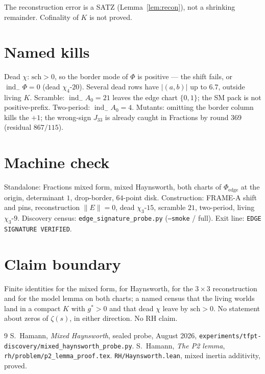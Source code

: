 \documentclass[11pt]{article}
\theoremstyle{remark}
\newcommand{\indm}{\operatorname{ind}_{-}}
\begin{document}
The reconstruction error is a SATZ (Lemma~\ref{lem:recon}),
not a shrinking remainder.
Cofinality of $K$ is not proved.

\section{Named kills}\label{sec:kills}

Dead $\chi$: $\mathrm{sch}>0$, so the border mode of $\Phi$ is
positive --- the shift fails, or $\indm\Phi=0$ (dead $\chi_{4}$-$20$).
Several dead rows have $|(a,b)|$ up to $6.7$, outside living $K$.
Scramble: $\indm A_{0}=21$ leaves the edge chart $\{0,1\}$;
the SM pack is not positive-prefix.
Two-period: $\indm A_{0}=4$.
Mutants: omitting the border column kills the $+1$;
the wrong-sign $J_{33}$ is already caught in Fractions by
round 369 (residual $867/115$).

\section*{Machine check}

Standalone: Fractions mixed form, mixed Haynsworth, both
charts of $\Phi_{\mathrm{edge}}$ at the origin, determinant $1$,
drop-border, $64$-point disk.
Construction: FRAME-A shift and pins, reconstruction
$\|E\|=0$, dead $\chi_{3}$-$15$, scramble $21$, two-period,
living $\chi_{3}$-$9$.
Discovery census: \texttt{edge\_signature\_probe.py}
(\texttt{--smoke} / full).
Exit line: \texttt{EDGE SIGNATURE VERIFIED}.

\section*{Claim boundary}

Finite identities for the mixed form, for Haynsworth, for the
$3\times 3$ reconstruction and for the model lemma on both charts;
a named census that the living worlds land in a compact $K$
with $g^{*}>0$ and that dead $\chi$ leave by $\mathrm{sch}>0$.
No statement about zeros of $\zeta(s)$, in either direction.
No RH claim.

\begin{thebibliography}{9}
S.~Hamann,
\textit{Mixed Haynsworth},
sealed probe, August 2026,
\texttt{experiments/tfpt-discovery/mixed\_haynsworth\_probe.py}.
S.~Hamann,
\textit{The P2 lemma},
\texttt{rh/problem/p2\_lemma\_proof.tex}.
\texttt{RH/Haynsworth.lean}, mixed inertia additivity, proved.
\end{thebibliography}
\end{document}
